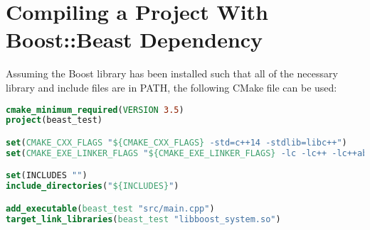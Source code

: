 \chapter{Compiling a Project With Boost::Beast Dependency}

Assuming the Boost library has been installed such that all of the necessary library and include files are in PATH, the following CMake file can be used:
\begin{lstlisting}[language=CMake]
cmake_minimum_required(VERSION 3.5)
project(beast_test)

set(CMAKE_CXX_FLAGS "${CMAKE_CXX_FLAGS} -std=c++14 -stdlib=libc++")
set(CMAKE_EXE_LINKER_FLAGS "${CMAKE_EXE_LINKER_FLAGS} -lc -lc++ -lc++abi -lpthread")

set(INCLUDES "")
include_directories("${INCLUDES}")

add_executable(beast_test "src/main.cpp")
target_link_libraries(beast_test "libboost_system.so")
\end{lstlisting}
